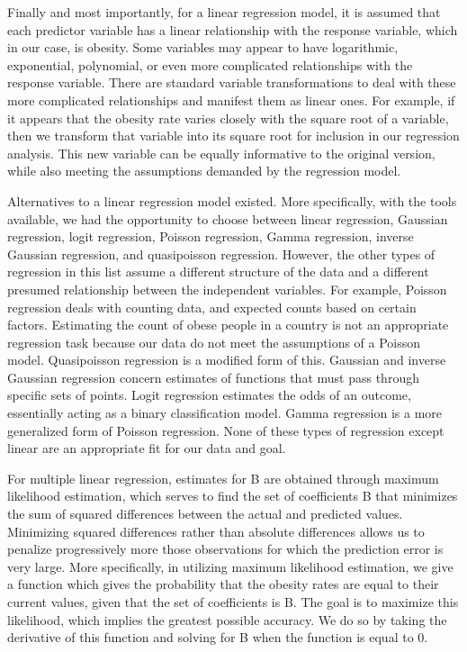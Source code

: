 \documentclass[oneside,12pt]{report}
\begin{document}
Finally and most importantly, for a linear regression model, it is assumed that each predictor variable has a linear relationship with the response variable, which in our case, is obesity. Some variables may appear to have logarithmic, exponential, polynomial, or even more complicated relationships with the response variable. There are standard variable transformations to deal with these more complicated relationships and manifest them as linear ones. For example, if it appears that the obesity rate varies closely with the square root of a variable, then we transform that variable into its square root for inclusion in our regression analysis. This new variable can be equally informative to the original version, while also meeting the assumptions demanded by the regression model.

Alternatives to a linear regression model existed. More specifically, with the tools available, we had the opportunity to choose between linear regression, Gaussian regression, logit regression, Poisson regression, Gamma regression, inverse Gaussian regression, and quasipoisson regression. However, the other types of regression in this list assume a different structure of the data and a different presumed relationship between the independent variables. For example, Poisson regression deals with counting data, and expected counts based on certain factors. Estimating the count of obese people in a country is not an appropriate regression task because our data do not meet the assumptions of a Poisson model. Quasipoisson regression is a modified form of this. Gaussian and inverse Gaussian regression concern estimates of functions that must pass through specific sets of points. Logit regression estimates the odds of an outcome, essentially acting as a binary classification model. Gamma regression is a more generalized form of Poisson regression. None of these types of regression except linear are an appropriate fit for our data and goal.

For multiple linear regression, estimates for B are obtained through maximum likelihood estimation, which serves to find the set of coefficients B that minimizes the sum of squared differences between the actual and predicted values. Minimizing squared differences rather than absolute differences allows us to penalize progressively more those observations for which the prediction error is very large. More specifically, in utilizing maximum likelihood estimation, we give a function which gives the probability that the obesity rates are equal to their current values, given that the set of coefficients is B. The goal is to maximize this likelihood, which implies the greatest possible accuracy. We do so by taking the derivative of this function and solving for B when the function is equal to 0.
\end{document}
